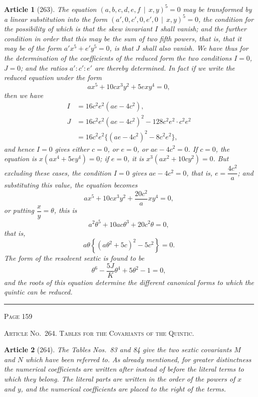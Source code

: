 \documentclass[11pt,a4paper]{article}
\theoremstyle{cayley}
\newtheorem{art}{Article}
\begin{document}
\begin{art}[263]
The equation $(a, b, c, d, e, f \,\mid\, x, y)^5 = 0$ may be transformed by a linear substitution into the form $(a', 0, c', 0, e', 0 \,\mid\, x, y)^5 = 0$, the condition for the possibility of which is that the skew invariant $I$ shall vanish; and the further condition in order that this may be the sum of two fifth powers, that is, that it may be of the form $a'x^5 + e'y^5 = 0$, is that $J$ shall also vanish. We have thus for the determination of the coefficients of the reduced form the two conditions $I=0$, $J=0$; and the ratios $a' : c' : e'$ are thereby determined. In fact if we write the reduced equation under the form
\[
ax^5 + 10cx^3y^2 + 5exy^4 = 0,
\]
then we have
\begin{align*}
I &= 16c^2e^2(ae - 4c^2), \\
J &= 16c^2e^2(ae - 4c^2)^2 - 128c^2e^2\cdot c^2e^2 \\
  &= 16c^2e^2\{(ae-4c^2)^2 - 8c^2e^2\},
\end{align*}
and hence $I=0$ gives either $c=0$, or $e=0$, or $ae - 4c^2 = 0$. If $c=0$, the equation is $x(ax^4 + 5ey^4) = 0$; if $e=0$, it is $x^3(ax^2 + 10cy^2) = 0$. But excluding these cases, the condition $I=0$ gives $ae - 4c^2 = 0$, that is, $e = \dfrac{4c^2}{a}$; and substituting this value, the equation becomes
\[
ax^5 + 10cx^3y^2 + \frac{20c^2}{a}xy^4 = 0,
\]
or putting $\dfrac{x}{y} = \theta$, this is
\[
a^2\theta^5 + 10ac\theta^3 + 20c^2\theta = 0,
\]
that is,
\[
a\theta\left\{\left(a\theta^2 + 5c\right)^2 - 5c^2\right\} = 0.
\]
The form of the resolvent sextic is found to be
\[
\theta^6 - \frac{5J}{K}\theta^4 + 5\theta^2 - 1 = 0,
\]
and the roots of this equation determine the different canonical forms to which the quintic can be reduced.
\end{art}

\vspace{1em}
\noindent\rule{\textwidth}{0.4pt}
\begin{center}\textsc{Page 159}\end{center}
\newpage

\begin{center}
\textsc{Article No.\ 264. Tables for the Covariants of the Quintic.}
\end{center}

\begin{art}[264]
The Tables Nos.~83 and 84 give the two sextic covariants $M$ and $N$ which have been referred to. As already mentioned, for greater distinctness the numerical coefficients are written after instead of before the literal terms to which they belong. The literal parts are written in the order of the powers of $x$ and $y$, and the numerical coefficients are placed to the right of the terms.
\end{art}
\end{document}

